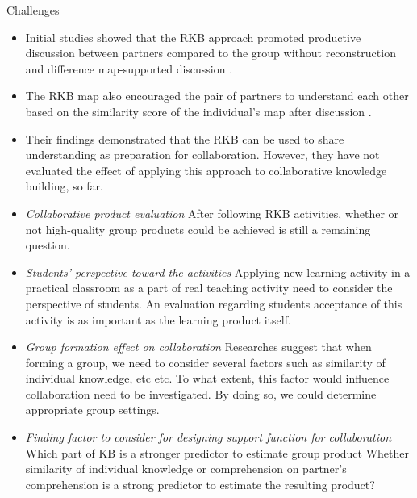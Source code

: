 \begin{frame}[allowframebreaks]{Challenges}
    \begin{itemize}
        \item Initial studies showed that the RKB approach promoted productive
        discussion between partners compared to the group without reconstruction
        and difference map-supported discussion
        \cite{Wunnasri2018ReciprocalUnderstanding}. 
        \item The RKB map also encouraged the pair of partners to understand each other based on the similarity
        score of the individual's map after discussion
        \cite{Wunnasri2018ReciprocalCollaboration}. 
        \item Their findings demonstrated that the RKB can be used to share understanding as preparation for
        collaboration. However, they have not evaluated the effect of applying
        this approach to collaborative knowledge building, so far. 
        \item \emph{Collaborative product evaluation} After following RKB activities, 
        whether or not high-quality group products could be achieved is still 
        a remaining question.  
        \item \emph{Students' perspective toward the activities} Applying new learning activity 
        in a practical classroom as a part of real teaching activity need to 
        consider the perspective of students. An evaluation regarding 
        students acceptance of this activity is as important as the learning product itself. 
        \item \emph{Group formation effect on collaboration} Researches suggest that 
        when forming a group, we need to consider several factors 
        such as similarity of individual knowledge, etc etc.
        To what extent, this factor would influence collaboration need to be investigated.
        By doing so, we could determine appropriate group settings. 
        \item \emph{Finding factor to consider for designing support function for collaboration}
        Which part of KB is a stronger predictor to estimate group product
        Whether similarity of individual knowledge or comprehension
        on partner's comprehension is a strong predictor to
        estimate the resulting product? 
    \end{itemize}
\end{frame}





